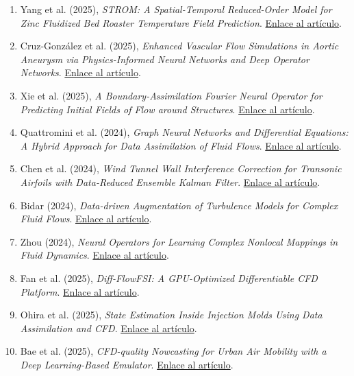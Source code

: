 \documentclass[12pt]{article}
\begin{document}
\begin{enumerate}
  \item Yang et al. (2025), \textit{STROM: A Spatial-Temporal Reduced-Order Model for Zinc Fluidized Bed Roaster Temperature Field Prediction}. \href{https://www.sciencedirect.com/science/article/pii/S209580992500236X}{Enlace al artículo}.

  \item Cruz-González et al. (2025), \textit{Enhanced Vascular Flow Simulations in Aortic Aneurysm via Physics-Informed Neural Networks and Deep Operator Networks}. \href{https://arxiv.org/pdf/2503.17402}{Enlace al artículo}.

  \item Xie et al. (2025), \textit{A Boundary-Assimilation Fourier Neural Operator for Predicting Initial Fields of Flow around Structures}. \href{https://pubs.aip.org/aip/pof/article/37/2/027148/3335812}{Enlace al artículo}.

  \item Quattromini et al. (2024), \textit{Graph Neural Networks and Differential Equations: A Hybrid Approach for Data Assimilation of Fluid Flows}. \href{https://arxiv.org/pdf/2411.09476?}{Enlace al artículo}.

  \item Chen et al. (2024), \textit{Wind Tunnel Wall Interference Correction for Transonic Airfoils with Data-Reduced Ensemble Kalman Filter}. \href{https://www.researchgate.net/profile/Gang-Wang-29/publication/384719324_Wind_tunnel_wall_interference_correction_for_transonic_airfoils_with_data-reduced_ensemble_Kalman_filter/links/6704f2d47d49be5c483dc5cf/Wind-tunnel-wall-interference-correction-for-transonic-airfoils-with-data-reduced-ensemble-Kalman-filter.pdf}{Enlace al artículo}.

  \item Bidar (2024), \textit{Data-driven Augmentation of Turbulence Models for Complex Fluid Flows}. \href{https://etheses.whiterose.ac.uk/id/oai_id/oai:etheses.whiterose.ac.uk:35649}{Enlace al artículo}.

  \item Zhou (2024), \textit{Neural Operators for Learning Complex Nonlocal Mappings in Fluid Dynamics}. \href{https://vtechworks.lib.vt.edu/bitstreams/4b7a3daf-d527-4574-8899-1d05dcd1171d/download}{Enlace al artículo}.

  \item Fan et al. (2025), \textit{Diff-FlowFSI: A GPU-Optimized Differentiable CFD Platform}. \href{https://arxiv.org/pdf/2505.23940}{Enlace al artículo}.

  \item Ohira et al. (2025), \textit{State Estimation Inside Injection Molds Using Data Assimilation and CFD}. \href{https://www.jstage.jst.go.jp/article/ijat/19/3/19_304/_pdf}{Enlace al artículo}.

  \item Bae et al. (2025), \textit{CFD-quality Nowcasting for Urban Air Mobility with a Deep Learning-Based Emulator}. \href{https://iopscience.iop.org/article/10.1088/1748-9326/addc84/pdf}{Enlace al artículo}.
\end{enumerate}
\end{document}

